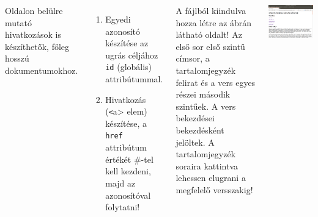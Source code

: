 \documentclass[usenames,dvipsnames,aspectratio=169]{beamer}
\begin{document}
\begin{frame}
  \begin{columns}[c]
    \footnotesize
      Oldalon belülre mutató hivatkozások is készíthetők, főleg hosszú dokumentumokhoz.
      \begin{enumerate}
        \item Egyedi azonosító készítése az ugrás céljához \texttt{id} (globális) attribútummal.
        \item Hivatkozás (\texttt<a> elem) készítése, a \texttt{href} attribútum értékét \#-tel kell kezdeni, majd az azonosítóval folytatni!
      \end{enumerate}
      \vfill
      A  fájlból kiindulva hozza létre az ábrán látható oldalt! Az első sor első szintű címsor, a tartalomjegyzék felirat és a vers egyes részei második szintűek. A vers bekezdései bekezdésként jelöltek. A tartalomjegyzék soraira kattintva lehessen elugrani a megfelelő versszakig!
      \begin{center}
        \begin{exampleblock}{}
          \centering \includegraphics[scale=.2]{jonas.png}
        \end{exampleblock}
      \end{center}
  \end{columns}
\end{frame}
\end{document}
